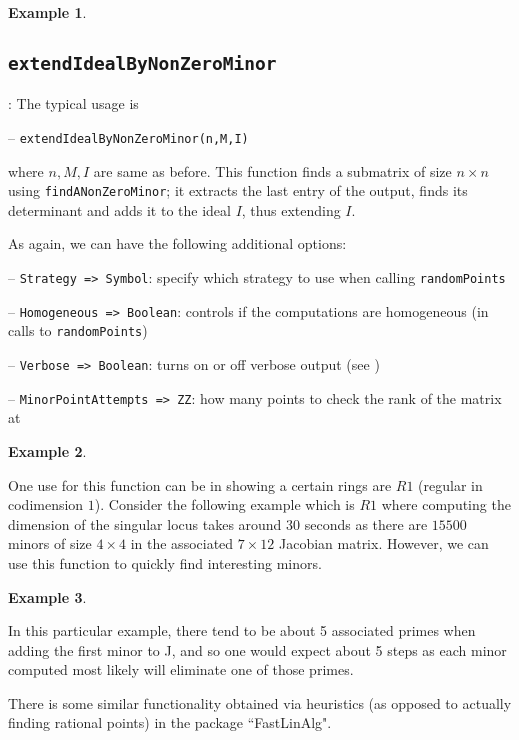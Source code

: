 \documentclass[11pt]{amsart}
\theoremstyle{definition}
\newtheorem{example}{Example}[section]
\begin{document}
\begin{example}
	
\end{example}

\subsection{\tt extendIdealByNonZeroMinor}\label{extendIdealByNonZeroMinor}: The typical usage is 

\vspace{1em}
-- {\tt extendIdealByNonZeroMinor(n,M,I)} 

\vspace{1em}
\noindent where $n,M,I$ are same as before. This function finds a submatrix of size $n\times n$ using {\tt findANonZeroMinor};  
it extracts the last entry of the output, finds its determinant and
adds it to the ideal $I$, thus extending $I$. 


As again, we can have the following additional options:

\vspace{1em}
-- {\tt Strategy => Symbol}: specify which strategy to use when calling {\tt randomPoints}

-- {\tt Homogeneous => Boolean}: controls if the computations are homogeneous (in calls to {\tt randomPoints})


-- {\tt Verbose => Boolean}: turns on or off verbose output (see )

-- {\tt MinorPointAttempts => ZZ}: how many points to check the rank of the matrix at    

  

\begin{example}
	
\end{example}

One use for this function can be in showing a certain rings are $R1$ (regular in codimension $1$).
Consider the following example which is $R1$ where computing the dimension of the singular locus takes around $30$ seconds as there are $15500$ minors of size $4 \times 4$ in the associated $7 \times 12$ Jacobian matrix.  However, we can use this function to quickly find interesting minors.
\begin{example}
	
	\end{example} 

In this particular example, there tend to be about 5 associated primes when adding the first minor to J, and so one would expect about 5 steps as each minor computed most likely will eliminate one of those primes.

There is some similar functionality obtained via heuristics (as opposed to actually finding rational points) in the package ``FastLinAlg".


\vspace{2em}
\end{document}
